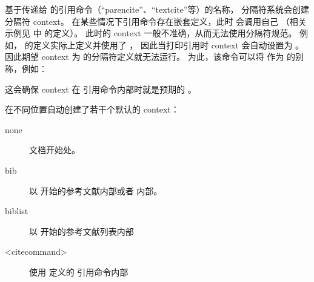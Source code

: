 \begin{ltxsyntax}

基于传递给  的引用命令（“parencite”、“textcite”等）的名称，
分隔符系统会创建分隔符 context。
在某些情况下引用命令存在嵌套定义，此时  会调用自己
（相关示例见  中  的定义）。
此时的 context 一般不准确，从而无法使用分隔符规范。
例如， 的定义实际上定义并使用了 ，
因此当打印引用时 context 会自动设置为 。
因此期望 context 为  的分隔符定义就无法运行。
为此，该命令可以将  作为  的别称，例如：

\begin{ltxexample}[style=latex]
\end{ltxexample}
%
这会确保 context 在  引用命令内部时就是预期的 。

\end{ltxsyntax}
%
\biblatex 在不同位置自动创建了若干个默认的 context：

\begin{description}
	\item[none] %
	文档开始处。
	\item[bib] %
	以  开始的参考文献内部或者  内部。
	\item[biblist] %
	以  开始的参考文献列表内部
	\item[<citecommand>] %
	使用  定义的  引用命令内部
\end{description}


